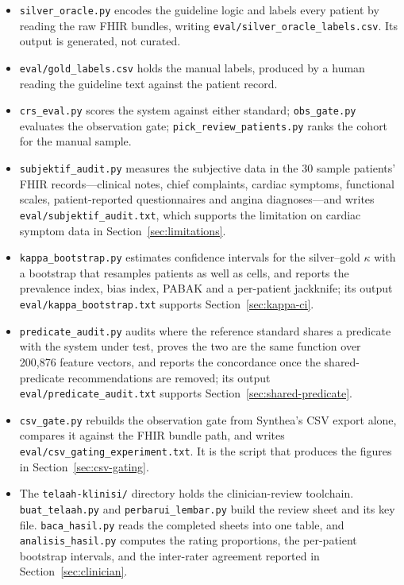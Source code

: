 \begin{itemize}
  \item \texttt{silver\_oracle.py} encodes the guideline logic and labels every
  patient by reading the raw FHIR bundles, writing \texttt{eval/silver\_oracle\_labels.csv}.
  Its output is generated, not curated.
  \item \texttt{eval/gold\_labels.csv} holds the manual labels, produced by a human
  reading the guideline text against the patient record.
  \item \texttt{crs\_eval.py} scores the system against either standard;
  \texttt{obs\_gate.py} evaluates the observation gate;
  \texttt{pick\_review\_patients.py} ranks the cohort for the manual sample.
  \item \texttt{subjektif\_audit.py} measures the subjective data in the 30 sample patients'
  FHIR records---clinical notes, chief complaints, cardiac symptoms, functional scales,
  patient-reported questionnaires and angina diagnoses---and writes
  \texttt{eval/subjektif\_audit.txt}, which supports the limitation on cardiac symptom data in
  Section~\ref{sec:limitations}.
  \item \texttt{kappa\_bootstrap.py} estimates confidence intervals for the silver--gold
  $\kappa$ with a bootstrap that resamples patients as well as cells, and reports the
  prevalence index, bias index, PABAK and a per-patient jackknife; its output
  \texttt{eval/kappa\_bootstrap.txt} supports Section~\ref{sec:kappa-ci}.
  \item \texttt{predicate\_audit.py} audits where the reference standard shares a predicate
  with the system under test, proves the two are the same function over 200{,}876 feature
  vectors, and reports the concordance once the shared-predicate recommendations are removed;
  its output \texttt{eval/predicate\_audit.txt} supports Section~\ref{sec:shared-predicate}.
  \item \texttt{csv\_gate.py} rebuilds the observation gate from Synthea's CSV export alone,
  compares it against the FHIR bundle path, and writes
  \texttt{eval/csv\_gating\_experiment.txt}. It is the script that produces the figures in
  Section~\ref{sec:csv-gating}.
  \item The \texttt{telaah-klinisi/} directory holds the clinician-review toolchain.
  \texttt{buat\_telaah.py} and \texttt{perbarui\_lembar.py} build the review sheet and its key
  file. \texttt{baca\_hasil.py} reads the completed sheets into one table, and
  \texttt{analisis\_hasil.py} computes the rating proportions, the per-patient bootstrap
  intervals, and the inter-rater agreement reported in Section~\ref{sec:clinician}.
\end{itemize}

